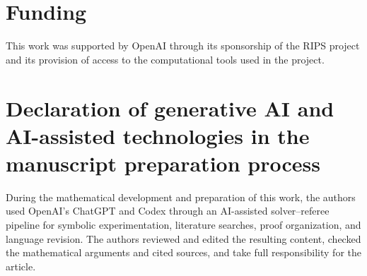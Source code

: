 \documentclass[11pt]{amsart}
\theoremstyle{definition}
\theoremstyle{remark}
\begin{document}
\section*{Funding}

This work was supported by OpenAI through its sponsorship of the RIPS project
and its provision of access to the computational tools used in the project.

\section*{Declaration of generative AI and AI-assisted technologies in the
manuscript preparation process}

During the mathematical development and preparation of this work, the authors
used OpenAI's ChatGPT and Codex through an AI-assisted solver--referee pipeline
for symbolic experimentation, literature searches, proof organization, and
language revision.  The authors reviewed and edited the resulting content,
checked the mathematical arguments and cited sources, and take full
responsibility for the article.
\end{document}
